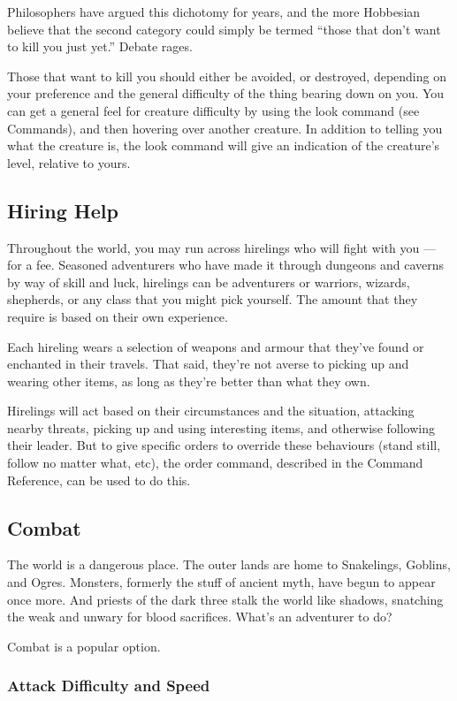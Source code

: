 Philosophers have argued this dichotomy for years, and the more Hobbesian
believe that the second category could simply be termed ``those that don't
want to kill you just yet.''  Debate rages.

Those that want to kill you should either be avoided, or destroyed,
depending on your preference and the general difficulty of the thing
bearing down on you.  You can get a general feel for creature difficulty
by using the look command (see Commands), and then hovering over another 
creature.  In addition to telling you what the creature is, the look 
command will give an indication of the creature's level, relative to yours.

\subsection{Hiring Help}
Throughout the world, you may run across hirelings who will fight with you ---
for a fee.  Seasoned adventurers who have made it through dungeons and caverns
by way of skill and luck, hirelings can be adventurers or warriors, wizards,
shepherds, or any class that you might pick yourself.  The amount that they
require is based on their own experience.

Each hireling wears a selection of weapons and armour that they've found or
enchanted in their travels.  That said, they're not averse to picking up and
wearing other items, as long as they're better than what they own.

Hirelings will act based on their circumstances and the situation, attacking
nearby threats, picking up and using interesting items, and otherwise following
their leader.  But to give specific orders to override these behaviours (stand
still, follow no matter what, etc), the order command, described in the 
Command Reference, can be used to do this.

\subsection{Combat}

The world is a dangerous place.  The outer lands are home to Snakelings,
Goblins, and Ogres.  Monsters, formerly the stuff of ancient myth, have
begun to appear once more.  And priests of the dark three stalk the world
like shadows, snatching the weak and unwary for blood sacrifices.  What's
an adventurer to do?

Combat is a popular option.

\subsubsection{Attack Difficulty and Speed}

